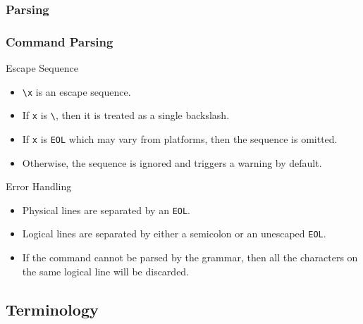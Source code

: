 \documentclass[9pt]{beamer}
\begin{document}
\subsubsection{Parsing}

\begin{frame}[t] \frametitle{Command Parsing}

	\begin{block}{Escape Sequence}
		\begin{itemize}
			\item \texttt{\textbackslash x} is an escape sequence.
			\item If \texttt{x} is \texttt{\textbackslash}, then it is treated as a single backslash.
			\item If \texttt{x} is \texttt{EOL} which may vary from platforms, then the sequence is omitted.
			\item Otherwise, the sequence is ignored and triggers a warning by default.
		\end{itemize}
	\end{block}

	\begin{block}{Error Handling}
		\begin{itemize}
			\item Physical lines are separated by an \texttt{EOL}.
			\item Logical lines are separated by either a semicolon or an unescaped \texttt{EOL}.
			\item If the command cannot be parsed by the grammar, then all the characters on the same logical line will be discarded.
		\end{itemize}
	\end{block}

\end{frame}

\subsection{Terminology}
\end{document}
